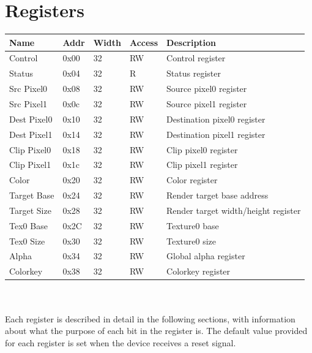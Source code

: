 \documentclass[10pt,a4paper]{article}
\begin{document}
\section{Registers}
\begin{tabular}{|l|l|l|l|l|}
\hline \textbf{Name} & \textbf{Addr} & \textbf{Width} & \textbf{Access} & \textbf{Description} \\ 
\hline
\hline Control & 0x00 & 32 & RW & Control register \\
\hline Status & 0x04 & 32 & R & Status register \\
\hline Src Pixel0 & 0x08 & 32 & RW & Source pixel0 register \\
\hline Src Pixel1 & 0x0c & 32 & RW & Source pixel1 register \\
\hline Dest Pixel0 & 0x10 & 32 & RW & Destination pixel0 register \\
\hline Dest Pixel1 & 0x14 & 32 & RW & Destination pixel1 register \\
\hline Clip Pixel0 & 0x18 & 32 & RW & Clip pixel0 register \\
\hline Clip Pixel1 & 0x1c & 32 & RW & Clip pixel1 register \\
\hline Color & 0x20 & 32 & RW & Color register \\
\hline Target Base & 0x24 & 32 & RW & Render target base address \\
\hline Target Size & 0x28 & 32 & RW & Render target width/height register \\
\hline Tex0 Base & 0x2C & 32 & RW & Texture0 base \\
\hline Tex0 Size & 0x30 & 32 & RW & Texture0 size \\
\hline Alpha & 0x34 & 32 & RW & Global alpha register \\
\hline Colorkey & 0x38 & 32 & RW & Colorkey register \\
\hline 
\end{tabular} 
\\\\
Each register is described in detail in the following sections, with information about what the purpose of each bit in the register is. The default value provided for each register is set when the device receives a reset signal.
\end{document}

